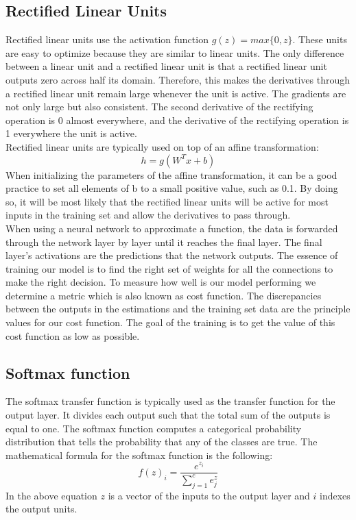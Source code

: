 \subsection{Rectified Linear Units}
Rectified linear units use the activation function $g(z) = max\{ 0,z \}$. These units are easy to optimize because they are similar to linear units. The only difference between a linear unit and a rectified linear unit is that a rectified linear unit outputs zero across half its domain. Therefore, this  makes the derivatives  through a rectified linear unit remain large whenever the unit is active. The gradients are not only large but also consistent. The second derivative of the rectifying operation is 0 almost everywhere, and the derivative of the rectifying operation is 1 everywhere the unit is active.\cite{Goodfellow-et-al-2016}\\
Rectified linear units are typically used on top of an affine transformation:
\begin{equation}
h = g(W^T x + b)
\end{equation}
When initializing the parameters of the affine transformation, it can be a good practice to set all elements  of b to a small positive value, such as 0.1. By doing so, it will be most likely that the rectified linear units will be active for most inputs in the training set and allow the derivatives to pass through. \\
When using a neural network to approximate a function, the data is forwarded through the network layer by layer until it reaches the final layer. The final layer's activations are the predictions that the network outputs. The essence of training our model  is to find the right set of weights for all the connections to make the right decision. To measure how well is our model performing we determine a metric which is also known as cost function. The discrepancies between the outputs in the estimations and the training set data are the principle values for our cost function. The goal of the training is to get the value of this cost function as low as possible.\cite{Goodfellow-et-al-2016}\\
\subsection{Softmax function}
The softmax transfer function is typically used as the transfer function for the output layer. It divides each output such that the total sum of the outputs is equal to one. The softmax function computes a categorical probability distribution that tells the probability that any of the classes are true. The mathematical formula for the softmax function is the following:
\begin{equation}
f{(z)}_i = \frac{e^{z_i}}{\sum_{j=1}^c e^{z}_j}
\end{equation}
In the above equation $z$ is a vector of the inputs to the output layer and $i$ indexes the output units.
